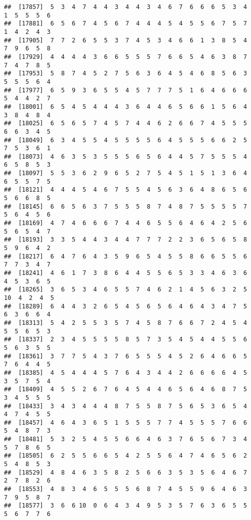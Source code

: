 \documentclass[
]{book}
\begin{document}
\begin{verbatim}
##  [17857]  5  3  4  7  4  4  3  4  4  3  4  6  7  6  6  6  5  3  4  1  5  5  5  6
##  [17881]  6  5  6  7  4  5  6  7  4  4  4  5  4  5  5  6  7  5  7  1  4  2  4  3
##  [17905]  7  7  2  6  5  5  3  7  4  5  3  4  6  6  1  3  8  5  4  7  9  6  5  8
##  [17929]  4  4  4  4  3  6  6  5  5  5  7  6  6  5  4  6  3  8  7  7  4  7  8  5
##  [17953]  5  8  7  4  5  2  7  5  6  3  6  4  5  4  6  8  5  6  3  5  5  5  6  4
##  [17977]  6  5  9  3  6  5  5  4  5  7  7  7  5  1  6  4  6  6  6  5  4  4  2  7
##  [18001]  6  5  4  5  4  4  4  3  6  4  4  6  5  6  6  1  5  6  4  3  8  4  8  4
##  [18025]  6  5  6  5  7  4  5  7  4  4  6  2  6  6  7  4  5  5  5  6  6  3  4  5
##  [18049]  6  3  4  5  5  4  5  5  5  5  6  4  5  5  5  6  6  2  5  7  5  3  6  1
##  [18073]  4  6  3  5  3  5  5  5  6  5  6  4  4  5  7  5  5  5  4  6  5  8  5  3
##  [18097]  5  5  3  6  2  9  6  5  2  7  5  4  5  1  5  1  3  6  4  6  5  5  7  5
##  [18121]  4  4  4  5  4  6  7  5  5  4  5  6  3  6  4  8  6  5  6  5  6  6  8  5
##  [18145]  6  6  5  6  3  7  5  5  5  8  7  4  8  7  5  5  5  5  7  5  6  4  5  6
##  [18169]  4  7  4  6  6  6  7  4  4  6  5  5  6  4  6  4  2  5  6  5  6  5  4  7
##  [18193]  3  3  5  4  4  3  4  4  7  7  7  2  2  3  6  5  6  5  8  5  9  6  4  2
##  [18217]  6  4  7  6  4  3  5  9  6  5  4  5  5  8  6  6  5  5  6  7  7  3  4  7
##  [18241]  4  6  1  7  3  8  6  4  4  5  5  6  5  3  3  4  6  3  6  4  5  3  6  5
##  [18265]  3  6  5  3  4  6  5  5  7  4  6  2  1  4  5  6  3  2  5 10  4  2  4  5
##  [18289]  6  4  4  3  2  6  5  4  5  6  5  6  4  6  4  3  4  7  5  6  3  6  6  4
##  [18313]  5  4  2  5  5  3  5  7  4  5  8  7  6  6  7  2  4  5  4  5  5  6  5  3
##  [18337]  2  3  4  5  5  5  5  8  5  7  3  5  4  5  4  4  5  5  6  5  6  3  5  5
##  [18361]  3  7  7  5  4  3  7  6  5  5  5  4  5  2  6  4  6  6  5  7  6  4  4  5
##  [18385]  4  5  4  4  4  5  7  6  4  3  4  4  2  6  6  6  6  4  5  3  5  7  5  4
##  [18409]  4  5  5  2  6  7  6  4  5  4  4  6  5  6  4  6  8  7  5  3  4  5  5  5
##  [18433]  3  4  3  4  4  4  8  7  5  5  8  7  5  6  5  3  6  5  4  4  7  4  5  5
##  [18457]  4  6  4  3  6  5  1  5  5  5  7  7  4  5  5  5  7  6  6  5  4  8  7  3
##  [18481]  5  3  2  5  4  5  5  6  6  4  6  3  7  6  5  6  7  3  4  5  7  8  6  5
##  [18505]  6  2  5  5  6  6  5  4  2  5  5  6  4  7  4  6  5  6  2  5  4  8  5  3
##  [18529]  4  8  4  6  3  5  8  2  5  6  6  3  5  3  5  6  4  6  7  2  7  8  2  6
##  [18553]  4  8  3  4  6  5  5  5  6  8  7  4  5  5  9  6  4  6  3  7  9  5  8  7
##  [18577]  3  6  6 10  0  6  4  3  4  9  5  3  5  7  6  3  6  5  5  5  6  7  7  6

\end{verbatim}
\end{document}
